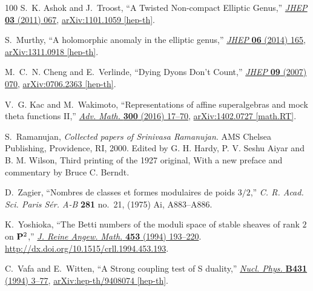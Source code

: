 \documentclass[11pt,a4paper,fontset=windows]{ctexart}
\numberwithin{equation}{section}
\begin{document}
\begin{thebibliography}{100}
S.~K. Ashok and J.~Troost, ``{A Twisted Non-compact Elliptic Genus},''
  \href{http://dx.doi.org/10.1007/JHEP03(2011)067}{{\em JHEP} {\bfseries 03}
  (2011) 067},
\href{http://arxiv.org/abs/1101.1059}{{\ttfamily arXiv:1101.1059 [hep-th]}}.

S.~Murthy, ``{A holomorphic anomaly in the elliptic genus},''
  \href{http://dx.doi.org/10.1007/JHEP06(2014)165}{{\em JHEP} {\bfseries 06}
  (2014) 165},
\href{http://arxiv.org/abs/1311.0918}{{\ttfamily arXiv:1311.0918 [hep-th]}}.

M.~C.~N. Cheng and E.~Verlinde, ``{Dying Dyons Don't Count},''
  \href{http://dx.doi.org/10.1088/1126-6708/2007/09/070}{{\em JHEP} {\bfseries
  09} (2007) 070},
\href{http://arxiv.org/abs/0706.2363}{{\ttfamily arXiv:0706.2363 [hep-th]}}.

V.~G. Kac and M.~Wakimoto, ``{Representations of affine superalgebras and mock
  theta functions II},''
  \href{http://dx.doi.org/10.1016/j.aim.2016.03.015}{{\em Adv. Math.}
  {\bfseries 300} (2016) 17--70},
\href{http://arxiv.org/abs/1402.0727}{{\ttfamily arXiv:1402.0727 [math.RT]}}.

S.~Ramanujan, {\em Collected papers of {S}rinivasa {R}amanujan}.
\newblock AMS Chelsea Publishing, Providence, RI, 2000.
\newblock Edited by G. H. Hardy, P. V. Seshu Aiyar and B. M. Wilson, Third
  printing of the 1927 original, With a new preface and commentary by Bruce C.
  Berndt.

D.~Zagier, ``Nombres de classes et formes modulaires de poids {$3/2$},'' {\em
  C. R. Acad. Sci. Paris S\'er. A-B} {\bfseries 281} no.~21, (1975) Ai,
  A883--A886.

K.~Yoshioka, ``The {B}etti numbers of the moduli space of stable sheaves of
  rank {$2$} on {$\bold P^2$},''
  \href{http://dx.doi.org/10.1515/crll.1994.453.193}{{\em J. Reine Angew.
  Math.} {\bfseries 453} (1994) 193--220}.
  \url{http://dx.doi.org/10.1515/crll.1994.453.193}.

C.~Vafa and E.~Witten, ``{A Strong coupling test of S duality},''
  \href{http://dx.doi.org/10.1016/0550-3213(94)90097-3}{{\em Nucl. Phys.}
  {\bfseries B431} (1994) 3--77},
\href{http://arxiv.org/abs/hep-th/9408074}{{\ttfamily arXiv:hep-th/9408074
  [hep-th]}}.


\end{thebibliography}
\end{document}
